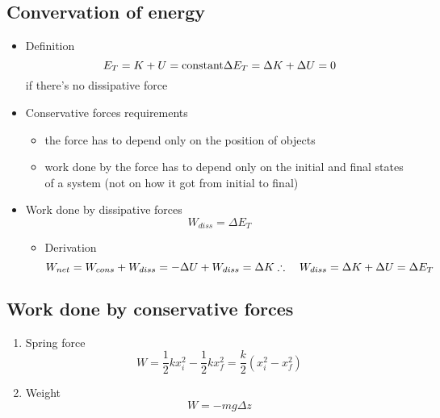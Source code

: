     \subsection{Convervation of energy}
        \begin{itemize}
            \item Definition
                \begin{equation}
                    E_T=K+U=\textrm{constant}\\
                    \Delta E_T=\Delta K+\Delta U=0
                \end{equation}
                if there's no dissipative force
            \item Conservative forces requirements
                \begin{itemize}
                    \item the force has to depend only on the position of objects
                    \item work done by the force has to depend only on the initial and final states of a system (not on how it got from initial to final)
                \end{itemize}
            \item Work done by dissipative forces
                \begin{equation}
                    W_{diss}=\Delta E_T
                \end{equation}
                \begin{itemize}
                    \item Derivation
                        \begin{equation}
                            W_{net}=W_{cons}+W_{diss}=-\Delta U+W_{diss}=\Delta K\\
                            \therefore \quad W_{diss}=\Delta K+\Delta U=\Delta E_T
                        \end{equation}
                \end{itemize}
        \end{itemize}
    \subsection{Work done by conservative forces}
        \begin{enumerate}
            \item Spring force
                \begin{equation}
                    W=\frac{1}{2}kx_i^2-\frac{1}{2}kx_f^2=\frac{k}{2}\left(x_i^2-x_f^2\right)
                \end{equation}
            \item Weight
                \begin{equation}
                    W=-mg\Delta z
                \end{equation}
        \end{enumerate}

